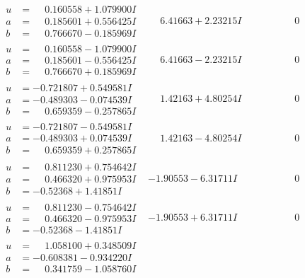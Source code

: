 \documentclass[1p]{elsarticle_modified}
\theoremstyle{definition}
\begin{document}
$$\begin{array}{c|c|c}
\begin{aligned}
u &= \phantom{-}0.160558 + 1.079900 I \\
a &= \phantom{-}0.185601 + 0.556425 I \\
b &= \phantom{-}0.766670 - 0.185969 I\end{aligned}
 & \phantom{-}6.41663 + 2.23215 I & \phantom{-0.000000 } 0 \\ \hline\begin{aligned}
u &= \phantom{-}0.160558 - 1.079900 I \\
a &= \phantom{-}0.185601 - 0.556425 I \\
b &= \phantom{-}0.766670 + 0.185969 I\end{aligned}
 & \phantom{-}6.41663 - 2.23215 I & \phantom{-0.000000 } 0 \\ \hline\begin{aligned}
u &= -0.721807 + 0.549581 I \\
a &= -0.489303 - 0.074539 I \\
b &= \phantom{-}0.659359 - 0.257865 I\end{aligned}
 & \phantom{-}1.42163 + 4.80254 I & \phantom{-0.000000 } 0 \\ \hline\begin{aligned}
u &= -0.721807 - 0.549581 I \\
a &= -0.489303 + 0.074539 I \\
b &= \phantom{-}0.659359 + 0.257865 I\end{aligned}
 & \phantom{-}1.42163 - 4.80254 I & \phantom{-0.000000 } 0 \\ \hline\begin{aligned}
u &= \phantom{-}0.811230 + 0.754642 I \\
a &= \phantom{-}0.466320 + 0.975953 I \\
b &= -0.52368 + 1.41851 I\end{aligned}
 & -1.90553 - 6.31711 I & \phantom{-0.000000 } 0 \\ \hline\begin{aligned}
u &= \phantom{-}0.811230 - 0.754642 I \\
a &= \phantom{-}0.466320 - 0.975953 I \\
b &= -0.52368 - 1.41851 I\end{aligned}
 & -1.90553 + 6.31711 I & \phantom{-0.000000 } 0 \\ \hline\begin{aligned}
u &= \phantom{-}1.058100 + 0.348509 I \\
a &= -0.608381 - 0.934220 I \\
b &= \phantom{-}0.341759 - 1.058760 I\end{aligned}

\end{array}$$
\end{document}
